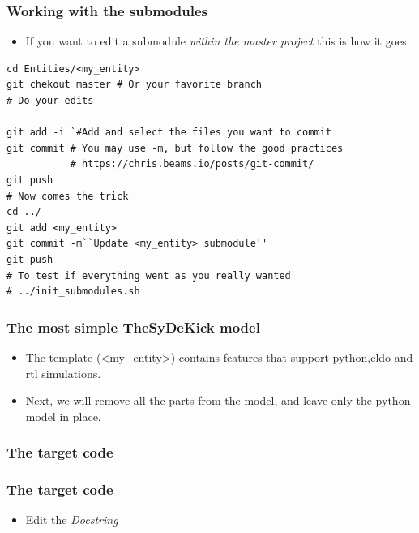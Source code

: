 \documentclass[logo=bluequo,normaltitle]{aaltoslides}
\begin{document}
\begin{frame}[t,fragile]
    \frametitle{Working with the submodules} 
    \begin{itemize}
        \item If you want to edit a submodule \emph{within the master project}
                this is how it goes
    \end{itemize}
\begin{lstlisting}
cd Entities/<my_entity>
git chekout master # Or your favorite branch
# Do your edits

git add -i `#Add and select the files you want to commit
git commit # You may use -m, but follow the good practices
           # https://chris.beams.io/posts/git-commit/
git push
# Now comes the trick
cd ../
git add <my_entity>
git commit -m``Update <my_entity> submodule''
git push
# To test if everything went as you really wanted
# ../init_submodules.sh
\end{lstlisting}
\end{frame}

\begin{frame}[t,fragile]
    \frametitle{The most simple  TheSyDeKick model} 
    \begin{itemize}
        \item The template (<my\_entity>) contains features that support
            python,eldo and rtl simulations.
        \item Next, we will remove all the parts from the model, and leave
            only the python model in place.
    \end{itemize}
\end{frame}

\begin{frame}[t,fragile]
    \frametitle{The target code} 
\end{frame}

\begin{frame}[t,fragile]
    \frametitle{The target code} 
    \begin{itemize}
        \item Edit the \emph{Docstring}
    \end{itemize}
\end{frame}
\end{document}
